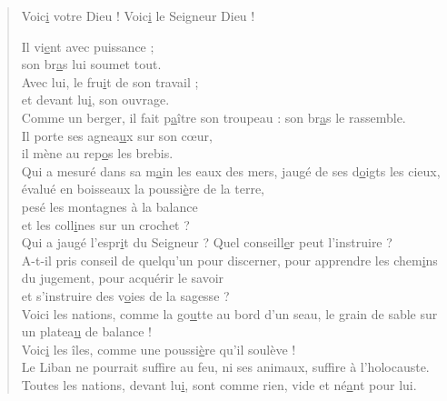 \begin{verse}
Voic\underline{i} votre Dieu !\psalmstar
{}Voic\underline{i} le Seigneur Dieu !\psalmstar

Il vi\underline{e}nt avec puissance ;\\
son br\underline{a}s lui soumet tout.\\
Avec lui, le fru\underline{i}t de son travail ;\\
et devant lu\underline{i}, son ouvrage.\\

Comme un berger, il fait p\underline{a}ître son troupeau :\psalmstar
son br\underline{a}s le rassemble.\\
Il porte ses agnea\underline{u}x sur son cœur,\\
il mène au rep\underline{o}s les brebis.\\

Qui a mesuré dans sa m\underline{a}in les eaux des mers,\psalmstar
jaugé de ses d\underline{o}igts les cieux,\\
évalué en boisseaux la poussi\underline{è}re de la terre,\\
pesé les montagnes à la balance\\
et les coll\underline{i}nes sur un crochet ?\\

Qui a jaugé l'espr\underline{i}t du Seigneur ?\psalmstar
Quel conseill\underline{e}r peut l'instruire ?\\

A-t-il pris conseil de quelqu'un pour discerner, \psalmdagger
pour apprendre les chem\underline{i}ns du jugement, \psalmstar
pour acquérir le savoir\\
et s'instruire des v\underline{o}ies de la sagesse ?\\

Voici les nations,\psalmstar
comme la go\underline{u}tte au bord d'un seau, \psalmstar
le grain de sable sur un platea\underline{u} de balance !\\
Voic\underline{i} les îles, \psalmstar
comme une poussi\underline{è}re qu'il soulève !\\

Le Liban ne pourrait suff\underline{i}re au feu,\psalmstar
ni ses animaux, suff\underline{i}re à l'holocauste.\\

Toutes les nations, devant lu\underline{i}, sont comme rien,\psalmstar
vide et né\underline{a}nt pour lui.
\end{verse}

